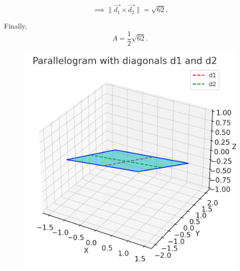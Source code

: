 \documentclass[journal]{IEEEtran}
\begin{document}
\[
\implies \|\vec{d_1} \times \vec{d_2}\| = \sqrt{62}.
\]

Finally,
\[
A = \frac{1}{2}\sqrt{62}.
\]

\begin{figure}[htbp]
    \centering
    \includegraphics[width=0.8\linewidth]{figs/fig1.jpg}
    \caption{}
    \label{fig:fig/fig1.png}
\end{figure}
\end{document}
